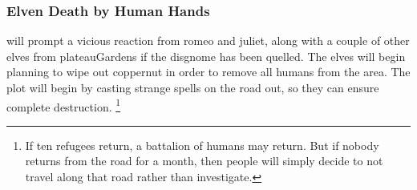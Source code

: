 \begin{multicols}{2}
\subsubsection{Elven Death by Human Hands}
will prompt a vicious reaction from \gls{romeo} and \gls{juliet}, along with a couple of other elves from \gls{plateauGardens} if the \gls{disgnome} has been quelled.
The elves will begin planning to wipe out \gls{coppernut} in order to remove all humans from the area.
The plot will begin by casting strange spells on the road out, so they can ensure complete destruction.%
\footnote{If ten refugees return, a battalion of humans may return.
But if nobody returns from the road for a month, then people will simply decide to not travel along that road rather than investigate.}

\iftoggle{verbose}{
  \subsection{Broken Resolutions}

  If your table runs out of time for the night, and you need to wrap everything up quickly, switch to \gls{downtime} plans, and give each \gls{pc} \pgls{action}.
  If they want to negotiate with \gls{MindElder}, they might roll \roll{Intelligence}{Empathy}, or if they think it's time to kill those \glspl{ogre}, sleeping in their \glspl{sepulchre}.

  For some added drama, ask each player to roll under a cup, napkin, or sleeve.
  Leave the \gls{natural} hidden until everyone has decided what they want to do.
  One all results are in, determine the outcomes based entirely on the rolls.
  If \pgls{pc} spent the entire \gls{downtime} trying to redirect the river through \gls{shadepaths}, it could \gls{flood} the \gls{sunway} and block snails from accessing \gls{ravencops}.
  Or if they spent their time trying to kill \glspl{ogre}, a failed roll could mean that \pgls{ogre} eats the \gls{pc} alive before marauding around \gls{ravencops}.
}{

  \subsection{No Way Home}

  If you want to run this arc over multiple sessions, or if the troupe find themselves stuck here over \gls{downtime}, the elven lands have plenty of reasons for characters to leave, disappear or get distracted.

  \subsubsection{In \glsfmttext{plateauGardens}}

}
\end{multicols}
